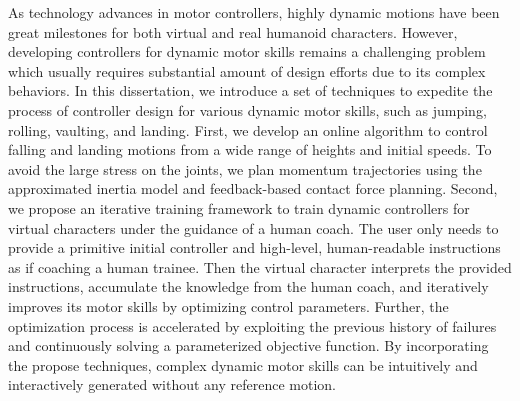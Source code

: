 \begin{summary}

As technology advances in motor controllers, highly dynamic motions
have been great milestones for both virtual and real humanoid characters.
However, developing controllers for dynamic motor skills remains a challenging
problem which usually requires substantial amount of design efforts
due to its complex behaviors.
In this dissertation, we introduce a set of techniques to expedite the
process of controller design for various dynamic motor skills,
such as jumping, rolling, vaulting, and landing.
First, we develop an online algorithm to control falling and landing motions 
from a wide range of heights and initial speeds. 
To avoid the large stress on the joints, we plan momentum trajectories 
using the approximated inertia model and feedback-based contact force planning.
Second, we propose an iterative training framework to train dynamic 
controllers for virtual characters under the guidance of a human coach.
The user only needs to provide a primitive initial controller and high-level, 
human-readable instructions as if coaching a human trainee.
Then the virtual character interprets the provided instructions,
accumulate the knowledge from the human coach,
and iteratively improves its motor skills by optimizing control parameters.
Further, the optimization process is accelerated by 
exploiting the previous history of failures and 
continuously solving a parameterized objective function.
By incorporating the propose techniques, complex dynamic motor skills
can be intuitively and interactively generated without any reference motion.




\end{summary}
